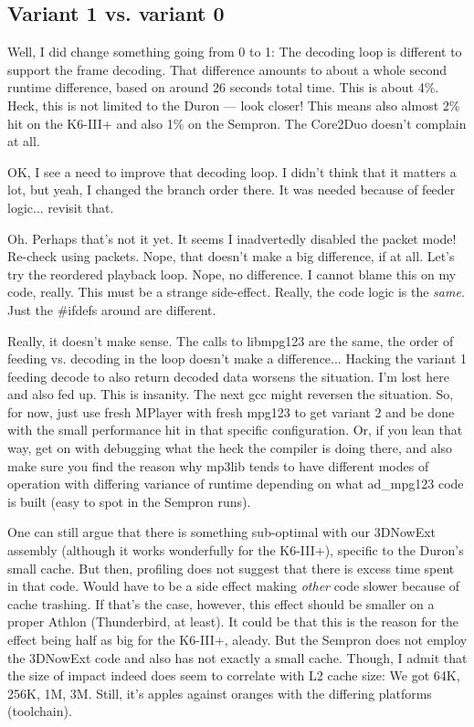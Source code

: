 \documentclass[a4paper,12pt]{scrartcl}
\begin{document}
\subsection{Variant 1 vs. variant 0}

Well, I did change something going from 0 to 1: The decoding loop is different to support the frame decoding.
That difference amounts to about a whole second runtime difference, based on around 26 seconds total time.
This is about 4\%.
Heck, this is not limited to the Duron --- look closer! This means also almost 2\% hit on the K6-III+ and also 1\% on the Sempron. The Core2Duo doesn't complain at all.

OK, I see a need to improve that decoding loop. I didn't think that it matters a lot, but yeah, I changed the branch order there. It was needed because of feeder logic... revisit that.

Oh. Perhaps that's not it yet. It seems I inadvertedly disabled the packet mode! Re-check using packets.
Nope, that doesn't make a big difference, if at all. Let's try the reordered playback loop.
Nope, no difference. I cannot blame this on my code, really.
This must be a strange side-effect. Really, the code logic is the {\em same}. Just the \#ifdefs around are different.

Really, it doesn't make sense. The calls to libmpg123 are the same, the order of feeding vs. decoding in the loop doesn't make a difference... Hacking the variant 1 feeding decode to also return decoded data worsens the situation. I'm lost here and also fed up.
This is insanity. The next gcc might reversen the situation. So, for now, just use fresh MPlayer with fresh mpg123 to get variant 2 and be done with the small performance hit in that specific configuration.
Or, if you lean that way, get on with debugging what the heck the compiler is doing there, and also make sure you find the reason why mp3lib tends to have different modes of operation with differing variance of runtime depending on what ad\_mpg123 code is built (easy to spot in the Sempron runs).

One can still argue that there is something sub-optimal with our 3DNowExt assembly (although it works wonderfully for the K6-III+), specific to the Duron's small cache. But then, profiling does not suggest that there is excess time spent in that code. Would have to be a side effect making {\em other} code slower because of cache trashing.
If that's the case, however, this effect should be smaller on a proper Athlon (Thunderbird, at least).
It could be that this is the reason for the effect being half as big for the K6-III+, aleady. But the Sempron does not employ the 3DNowExt code and also has not exactly a small cache. Though, I admit that the size of impact indeed does seem to correlate with L2 cache size: We got 64K, 256K, 1M, 3M.
Still, it's apples against oranges with the differing platforms (toolchain).
\end{document}
